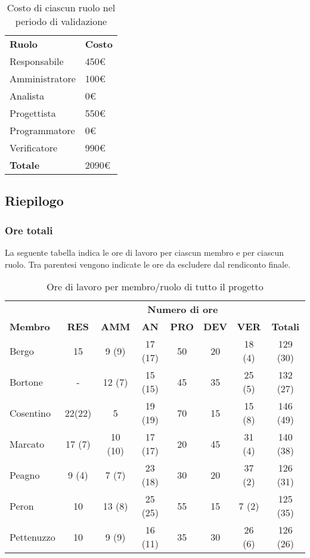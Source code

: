 		\begin{table}[h]
		\centering
		\begin{tabular}{| l | l |}
			\rowcolor{LightBlue}
			\textbf{\color{white}Ruolo}
			& \textbf{\color{white}Costo}\\
			
			Responsabile 		& 450€\\
			Amministratore 	& 100€\\
			Analista 				& 0€\\			
			Progettista 			& 550€\\
			Programmatore 		& 0€\\
			Verificatore 		& 990€\\ \hline
			\textbf{Totale} 	& 2090€\\ \hline
		\end{tabular}		
		\caption{Costo di ciascun ruolo nel periodo di validazione}
		\end{table}

\newpage
\subsection{Riepilogo}
	\subsubsection{Ore totali}
		La seguente tabella indica le ore di lavoro per ciascun membro e per ciascun ruolo. Tra parentesi vengono indicate le ore da escludere dal rendiconto finale.
		\begin{table}[h]
		\centering
		\begin{tabular}{| l | c c c c c c | c |}
			\rowcolor{LightBlue}
			& \multicolumn{7}{c}{\textbf{\color{white}Numero di ore}}	\\
	
			\rowcolor{LightBlue}
			\textbf{\color{white}Membro}
			& \textbf{\color{white}RES}
			& \textbf{\color{white}AMM}
			& \textbf{\color{white}AN}
			& \textbf{\color{white}PRO}
			& \textbf{\color{white}DEV}
			& \textbf{\color{white}VER}
			& \textbf{\color{white}Totali}\\
	
			Bergo 				& 15 		& 9 (9)		& 17 (17)		& 50 & 20 & 18 (4)	& 129 (30)\\
			Bortone 			& - 	 		& 12 (7)		& 15	 (15)		& 45 & 35 & 25 (5)	& 132 (27)\\
			Cosentino 		& 22(22)& 5	  			& 19 (19)		& 70 & 15 & 15 (8)	& 146 (49)\\
			Marcato 			& 17 (7)& 10 (10)	& 17 (17)		& 20 & 45 & 31 (4)	& 140 (38)\\
			Peagno 			& 9 (4)	& 7 (7)		& 23 (18)		& 30 & 20 & 37 (2)	& 126 (31)\\
			Peron 				& 10 		& 13 (8)		& 25 (25)		& 55 & 15 & 7  (2)	& 125 (35)\\
			Pettenuzzo 	& 10 		& 9 (9) 		& 16 (11)		& 35 & 30 & 26 (6)	& 126 (26)\\ \hline
		\end{tabular}
		\caption{Ore di lavoro per membro/ruolo di tutto il progetto}
		\end{table}
	
